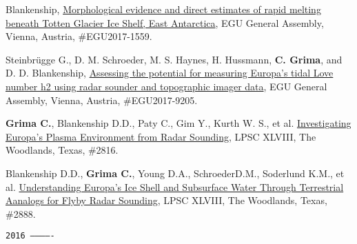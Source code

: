 \begin{etaremune}
  Blankenship,
  \href{http://meetingorganizer.copernicus.org/EGU2017/EGU2017-1559.pdf}{Morphological
  evidence and direct estimates of rapid melting beneath Totten Glacier
  Ice Shelf, East Antarctica}, EGU General Assembly, Vienna, Austria,
  \#EGU2017-1559.
\item
  Steinbrügge G., D. M. Schroeder, M. S. Haynes, H. Hussmann, \textbf{C.
  Grima}, and D. D. Blankenship,
  \href{http://meetingorganizer.copernicus.org/EGU2017/EGU2017-9205.pdf}{Assessing
  the potential for measuring Europa's tidal Love number h2 using radar
  sounder and topographic imager data}, EGU General Assembly, Vienna,
  Austria, \#EGU2017-9205.
\item
  \textbf{Grima C.}, Blankenship D.D., Paty C., Gim Y., Kurth W. S., et
  al.
  \href{http://www.lpi.usra.edu/meetings/lpsc2017/pdf/2816.pdf}{Investigating
  Europa's Plasma Environment from Radar Sounding}, LPSC XLVIII, The
  Woodlands, Texas, \#2816.
\item
  Blankenship D.D., \textbf{Grima C.}, Young D.A., SchroederD.M.,
  Soderlund K.M., et al.
  \href{http://www.lpi.usra.edu/meetings/lpsc2017/pdf/2888.pdf}{Understanding
  Europa's Ice Shell and Subsurface Water Through Terrestrial Aanalogs
  for Flyby Radar Sounding}, LPSC XLVIII, The Woodlands, Texas, \#2888.

\hspace{-2em}\texttt{2016 -------------}


\end{etaremune}
